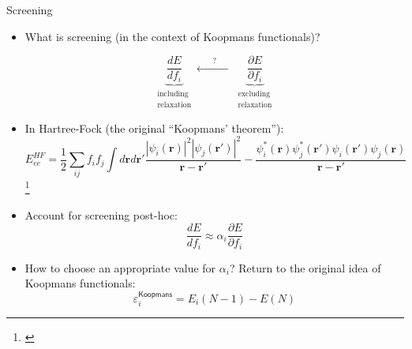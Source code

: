 \documentclass[xcolor=table,aspectratio=169]{beamer}
\newcommand\blfootcite[1]{%
  \begingroup
  \renewcommand\thefootnote{}\footnote{\hspace{-4ex}\cite{#1}}%
  \addtocounter{footnote}{-1}%
  \endgroup
}
\numberwithin{equation}{section}
\begin{document}
\begin{frame}{Screening}
   \small
   \begin{itemize}[<+->]
      \item What is screening (in the context of Koopmans functionals)?

            \begin{equation*}
               \underbrace{
                  \frac{d E}{d f_i}
               }_{\substack{\text{including} \\ \text{relaxation}}}
               \xleftarrow{\qquad ? \qquad}
               \underbrace{\frac{\partial E}{\partial f_i}
               }_{\substack{\text{excluding} \\ \text{relaxation}}}
            \end{equation*}
      \item In Hartree-Fock (the original ``Koopmans' theorem''):
            \begin{equation*}
               E^{HF}_{ee} = \frac{1}{2}\sum_{ij} f_i f_j \int d\mathbf{r} d\mathbf{r}' \frac{|\psi_i(\mathbf{r})|^2|\psi_j(\mathbf{r'})|^2}{\mathbf{r} - \mathbf{r}'} - \frac{\psi_i^*(\mathbf{r})\psi_j^*(\mathbf{r'})\psi_i(\mathbf{r'})\psi_j(\mathbf{r})}{\mathbf{r} - \mathbf{r}'}
            \end{equation*}
            \blfootcite{Li2017}
      \item Account for screening post-hoc:
            \begin{equation*}
               \frac{d E}{d f_i}
               \approx
               \alpha_i
               \frac{\partial E}{\partial f_i}
            \end{equation*}
      \item How to choose an appropriate value for $\alpha_i$? Return to the original idea of Koopmans functionals:
            \begin{equation*}
               \varepsilon_i^\mathsf{Koopmans} = E_i(N-1) - E(N)
            \end{equation*}
   \end{itemize}

\end{frame}
\end{document}
